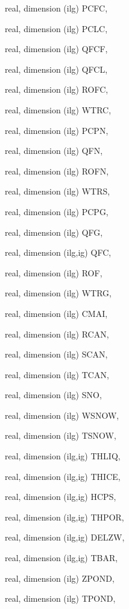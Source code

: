 {\begin{DoxyParamCaption}
\item[{real, dimension  (ilg)}]{P\+C\+F\+C, }
\item[{real, dimension  (ilg)}]{P\+C\+L\+C, }
\item[{real, dimension  (ilg)}]{Q\+F\+C\+F, }
\item[{real, dimension  (ilg)}]{Q\+F\+C\+L, }
\item[{real, dimension  (ilg)}]{R\+O\+F\+C, }
\item[{real, dimension  (ilg)}]{W\+T\+R\+C, }
\item[{real, dimension  (ilg)}]{P\+C\+P\+N, }
\item[{real, dimension   (ilg)}]{Q\+F\+N, }
\item[{real, dimension  (ilg)}]{R\+O\+F\+N, }
\item[{real, dimension  (ilg)}]{W\+T\+R\+S, }
\item[{real, dimension  (ilg)}]{P\+C\+P\+G, }
\item[{real, dimension   (ilg)}]{Q\+F\+G, }
\item[{real, dimension   (ilg,ig)}]{Q\+F\+C, }
\item[{real, dimension   (ilg)}]{R\+O\+F, }
\item[{real, dimension  (ilg)}]{W\+T\+R\+G, }
\item[{real, dimension  (ilg)}]{C\+M\+A\+I, }
\item[{real, dimension  (ilg)}]{R\+C\+A\+N, }
\item[{real, dimension  (ilg)}]{S\+C\+A\+N, }
\item[{real, dimension  (ilg)}]{T\+C\+A\+N, }
\item[{real, dimension   (ilg)}]{S\+N\+O, }
\item[{real, dimension (ilg)}]{W\+S\+N\+O\+W, }
\item[{real, dimension (ilg)}]{T\+S\+N\+O\+W, }
\item[{real, dimension (ilg,ig)}]{T\+H\+L\+I\+Q, }
\item[{real, dimension (ilg,ig)}]{T\+H\+I\+C\+E, }
\item[{real, dimension  (ilg,ig)}]{H\+C\+P\+S, }
\item[{real, dimension (ilg,ig)}]{T\+H\+P\+O\+R, }
\item[{real, dimension (ilg,ig)}]{D\+E\+L\+Z\+W, }
\item[{real, dimension  (ilg,ig)}]{T\+B\+A\+R, }
\item[{real, dimension (ilg)}]{Z\+P\+O\+N\+D, }
\item[{real, dimension (ilg)}]{T\+P\+O\+N\+D, }

\end{DoxyParamCaption}}
